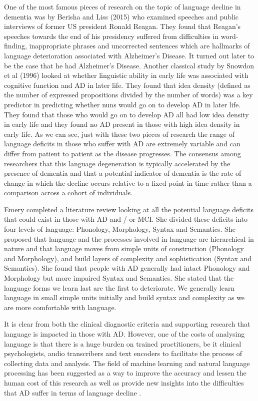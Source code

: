 \documentclass[12pt, twoside, a4paper]{article}
\begin{document}
\par
One of the most famous pieces of research on the topic of language decline in dementia was by Berisha and Liss (2015) \cite{Berisha2015} who examined speeches and public interviews of former US president Ronald Reagan. They found that Reagan's speeches towards the end of his presidency suffered from difficulties in word-finding, inappropriate phrases and uncorrected sentences which are hallmarks of language deterioration associated with Alzheimer's Disease. It turned out later to be the case that he had Alzheimer's Disease. Another classical study by Snowdon et al (1996) \cite{Snowdon1996} looked at whether linguistic ability in early life was associated with cognitive function and AD in later life. They found that idea density (defined as the number of expressed propositions divided by the number of words) was a key predictor in predicting whether nuns would go on to develop AD in later life. They found that those who would go on to develop AD all had low idea density in early life and they found no AD present in those with high idea density in early life. As we can see, just with these two pieces of research the range of language deficits in those who suffer with AD are extremely variable and can differ from patient to patient as the disease progresses. The consensus among researchers that this language degeneration is typically accelerated by the presence of dementia \cite{Berisha2015} and that a potential indicator of dementia is the rate of change in which the decline occurs relative to a fixed point in time rather than a comparison across a cohort of individuals. 
\par
Emery \cite{Emery2000} completed a literature review looking at all the potential language deficits that could exist in those with AD and / or MCI. She divided these deficits into four levels of language: Phonology, Morphology, Syntax and Semantics. She proposed that language and the processes involved in language are hierarchical in nature and that language moves from simple units of construction (Phonology and Morphology), and build layers of complexity and sophistication (Syntax and Semantics). She found that people with AD generally had intact Phonology and Morphology but more impaired Syntax and Semantics. She stated that the language forms we learn last are the first to deteriorate. We generally learn language in small simple units initially and build syntax and complexity as we are more comfortable with language.
\par
It is clear from both the clinical diagnostic criteria and supporting research that language is impacted in those with AD. However, one of the costs of analysing language is that there is a huge burden on trained practitioners, be it clinical psychologists, audio transcribers and text encoders to facilitate the process of collecting data and analysis. The field of machine learning and natural language processing has been suggested as a way to improve the accuracy and lessen the human cost of this research as well as provide new insights into the difficulties that AD suffer in terms of language decline \cite{Boschi2017}.
\end{document}
